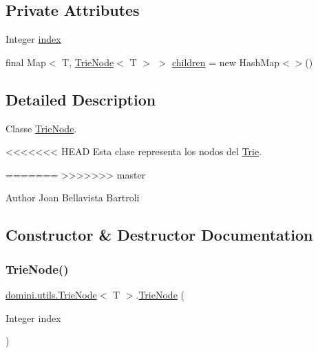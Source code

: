 \subsection*{Private Attributes}
\begin{DoxyCompactItemize}
\item 
Integer \hyperlink{classdomini_1_1utils_1_1TrieNode_a9c247bc6568131e5e6ad0758adb67bfa}{index}
\item 
final Map$<$ T, \hyperlink{classdomini_1_1utils_1_1TrieNode}{Trie\+Node}$<$ T $>$ $>$ \hyperlink{classdomini_1_1utils_1_1TrieNode_ae64d9c12696f526eecb3ff15aa290640}{children} = new Hash\+Map$<$$>$()
\end{DoxyCompactItemize}


\subsection{Detailed Description}
Classe \hyperlink{classdomini_1_1utils_1_1TrieNode}{Trie\+Node}. 

<<<<<<< HEAD
Esta clase representa los nodos del \hyperlink{classdomini_1_1utils_1_1Trie}{Trie}.

=======
>>>>>>> master
\begin{DoxyAuthor}{Author}
Joan Bellavista Bartroli 
\end{DoxyAuthor}


\subsection{Constructor \& Destructor Documentation}
\mbox{\label{classdomini_1_1utils_1_1TrieNode_af9a18353151b5e3dea5966f50629319a}} 
\subsubsection{\texorpdfstring{Trie\+Node()}{TrieNode()}}
{\footnotesize\ttfamily \hyperlink{classdomini_1_1utils_1_1TrieNode}{domini.\+utils.\+Trie\+Node}$<$ T $>$.\hyperlink{classdomini_1_1utils_1_1TrieNode}{Trie\+Node} (\begin{DoxyParamCaption}\item[{Integer}]{index }\end{DoxyParamCaption})\hspace{0.3cm}{\ttfamily [inline]}}



